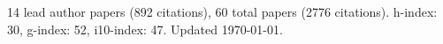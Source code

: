 14 lead author papers (892 citations),
60 total papers (2776 citations).\newline
h-index: 30, g-index: 52, i10-index: 47. Updated \today.